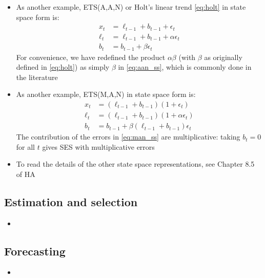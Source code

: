 \documentclass{article}
\begin{document}
\begin{itemize}
\item As another example, ETS(A,A,N) or Holt's linear trend \eqref{eq:holt} in 
  state space form is: 
  \begin{equation}
  \label{eq:aan_ss}
  \begin{aligned}
  x_t &= \ell_{t-1} + b_{t-1} + \epsilon_t \\
  \ell_t &= \ell_{t-1} + b_{t-1} + \alpha \epsilon_t \\
  b_t &= b_{t-1} + \beta \epsilon_t
  \end{aligned}
  \end{equation}
  For convenience, we have redefined the product $\alpha \beta$ (with $\beta$ as
  originally defined in \eqref{eq:holt}) as simply $\beta$ in \eqref{eq:aan_ss},
  which is commonly done in the literature  

\item As another example, ETS(M,A,N) in state space form is: 
  \begin{equation}
  \label{eq:man_ss}
  \begin{aligned}
  x_t &= (\ell_{t-1} + b_{t-1})(1 + \epsilon_t) \\
  \ell_t &= (\ell_{t-1} + b_{t-1})(1 + \alpha \epsilon_t) \\
  b_t &= b_{t-1} + \beta (\ell_{t-1} + b_{t-1}) \epsilon_t 
  \end{aligned}
  \end{equation}
  The contribution of the errors in \eqref{eq:man_ss} are multiplicative: taking
  $b_t = 0$ for all $t$ gives SES with multiplicative errors

\item To read the details of the other state space representations, see Chapter
  8.5 of HA
\end{itemize}

\subsection{Estimation and selection}

\begin{itemize}
\item 
\end{itemize}

\subsection{Forecasting}

\begin{itemize}
\item 
\end{itemize}
\end{document}
